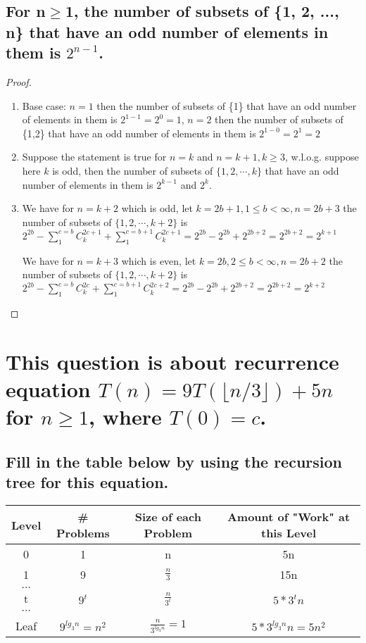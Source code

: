 \documentclass[a4paper]{article}
\begin{document}
\subsection{For n$\geq$1, the number of subsets of \{1, 2, ..., n\} that have an odd number of elements in them is $2^{n-1}$.}
\begin{proof}
    \begin{enumerate}
        \item Base case: $n=1$ then the number of subsets of \{1\} that have an odd number of elements in them is $2^{1-1}=2^0=1$, $n=2$ then the number of subsets of \{1,2\} that have an odd number of elements in them is $2^{1-0}=2^1=2$
        \item Suppose the statement is true for $n=k$ and $n=k+1, k \geq 3$, w.l.o.g. suppose here $k$ is odd, then the number of subsets of $\{1,2,\cdots,k\}$ that have an odd number of elements in them is $2^{k-1}$ and $2^k$. 
        \item We have for $n=k+2$ which is odd, let $k=2b+1, 1\leq b<\infty, n = 2b+3$ the number of subsets of $\{1,2,\cdots,k+2\}$ is $2^{2b} - \sum^{c=b}_{1}{C^{2c+1}_{k}} + \sum^{c=b+1}_{1}{C^{2c+1}_{k}}=2^{2b}-2^{2b}+2^{2b+2}=2^{2b+2}=2^{k+1}$

        We have for $n=k+3$ which is even, let $k=2b, 2\leq b<\infty, n = 2b+2$ the number of subsets of $\{1,2,\cdots,k+2\}$ is $2^{2b} - \sum^{c=b}_{1}{C^{2c}_{k}} + \sum^{c=b+1}_{1}{C^{2c+2}_{k}}=2^{2b}-2^{2b}+2^{2b+2}=2^{2b+2}=2^{k+2}$
    \end{enumerate}
\end{proof}
\section{This question is about recurrence equation $T(n)=9 T(\lfloor n / 3\rfloor)+5 n$ for $n \geq 1$, where $T(0)=c$.}
\subsection{Fill in the table below by using the recursion tree for this equation.}
\begin{tabular}{|c|c|c|c|}
    \hline Level & # Problems & Size of each Problem & Amount of "Work" at this Level \\
    \hline 0 & 1 & n & 5n \\
    \hline 1 & 9 & $\frac{n}{3}$ & 15n \\
    \hline$\ldots$  &  &  & \\
    \hline $\mathrm{t}$ & $9^t$ & $\frac{n}{3^{t}}$ & $5*3^tn$ \\
    \hline$\cdots$ & & & \\
    \hline Leaf & $9^{ {lg_{3}n} }=n^2$ &$\frac{n}{3^{ {lg_{3}n} }}=1$ &$5*3^{ {lg_{3}n} }n=5n^2$  \\
    \hline
    \end{tabular}
\end{document}
